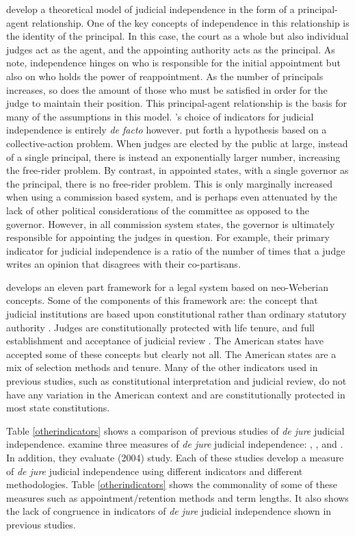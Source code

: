 \documentclass[12pt]{article}
\begin{document}
\citet{Choi2010} develop a theoretical model of judicial independence in the form of a principal-agent relationship.  One of the key concepts of independence in this relationship is the identity of the principal.  In this case, the court as a whole but also individual judges act as the agent, and the appointing authority acts as the principal.  As \citeauthor{Choi2010} note, independence hinges on who is responsible for the initial appointment but also on who holds the power of reappointment.  As the number of principals increases, so does the amount of those who must be satisfied in order for the judge to maintain their position.  This principal-agent relationship is the basis for many of the assumptions in this model.  \citet{Choi2010}'s choice of indicators for judicial independence is entirely \textit{de facto} however.  \citet[296]{Choi2010} put forth a hypothesis based on a collective-action problem.  When judges are elected by the public at large, instead of a single principal, there is instead an exponentially larger number, increasing the free-rider problem.  By contrast, in appointed states, with a single governor as the principal, there is no free-rider problem.  This is only marginally increased when using a commission based system, and is perhaps even attenuated by the lack of other political considerations of the committee as opposed to the governor.  However, in all commission system states, the governor is ultimately responsible for appointing the judges in question.  For example, their primary indicator for judicial independence is a ratio of the number of times that a judge writes an opinion that disagrees with their co-partisans.

\citet{Schmidhauser1987} develops an eleven part framework for a legal system based on neo-Weberian concepts.  Some of the components of this framework are: the concept that judicial institutions are based upon constitutional rather than ordinary statutory authority \citep{Schmidhauser1987}.  Judges are constitutionally protected with life tenure, and full establishment and acceptance of judicial review \citep[46-47]{Schmidhauser1987}.  The American states have accepted some of these concepts but clearly not all.  The American states are a mix of selection methods and tenure.  Many of the other indicators used in previous studies, such as constitutional interpretation and judicial review, do not have any variation in the American context and are constitutionally protected in most state constitutions. 

Table \ref{otherindicators} shows a comparison of previous studies of \textit{de jure} judicial independence.  \citet{Rios2014} examine three measures of \textit{de jure} judicial independence: \citet{Feld2003}, \citet{Keith2002a}, and \citet{Laporta2004}.  In addition, they evaluate \citeauthor{Apodaca2004} (2004) study.  Each of these studies develop a measure of \textit{de jure} judicial independence using different indicators and different methodologies.  Table \ref{otherindicators} shows the commonality of some of these measures such as appointment/retention methods and term lengths.  It also shows the lack of congruence in indicators of \textit{de jure} judicial independence shown in previous studies.
\end{document}
